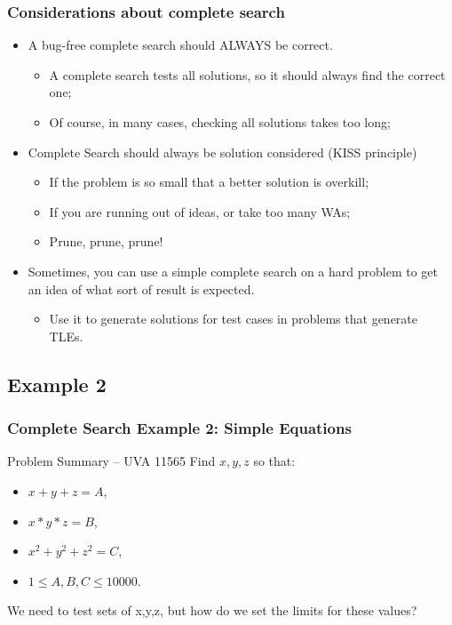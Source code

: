 \documentclass{beamer}
\begin{document}
\begin{frame}
  \frametitle{Considerations about complete search}
  \begin{itemize}
  \item A bug-free complete search should ALWAYS be correct.\\
    \begin{itemize}
    \item A complete search tests all solutions, so it should always
      find the correct one;
    \item Of course, in many cases, checking all solutions takes too long;
    \end{itemize}

    \bigskip

  \item Complete Search should always be solution considered (KISS
    principle)
    \begin{itemize}
    \item If the problem is so small that a better solution is overkill;
    \item If you are running out of ideas, or take too many WAs;
    \item Prune, prune, prune!
    \end{itemize}

    \bigskip

  \item Sometimes, you can use a simple complete search on a hard
    problem to get an idea of what sort of result is expected.
    \begin{itemize}
    \item Use it to generate solutions for test cases in problems that
      generate TLEs.
    \end{itemize}
  \end{itemize}
\end{frame}

\subsection{Example 2}

\begin{frame}
  \frametitle{Complete Search Example 2: Simple Equations}
  \begin{block}{Problem Summary -- UVA 11565}
    Find $x,y,z$ so that:
    \begin{itemize}
    \item $x+y+z=A$,
    \item $x*y*z=B$,
    \item $x^2+y^2+z^2=C$,
    \item $1 \leq A,B,C \leq 10000$.
    \end{itemize}

    \bigskip
  \end{block}

  \vfill

  We need to test sets of x,y,z, but how do we set the limits for
  these values?
\end{frame}
\end{document}
